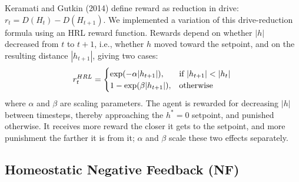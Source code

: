 \documentclass[12pt,fleqn]{article}
\begin{document}
Keramati and Gutkin (2014) define reward as reduction in drive: \(r_t = D(H_t) - D(H_{t+1})\). We implemented a variation of this drive-reduction formula using an HRL reward function. Rewards depend on whether \(|h|\) decreased from \(t\) to \(t+1\), i.e., whether \(h\) moved toward the setpoint, and on the resulting distance \(|h_{t+1}|\), giving two cases:
\begin{equation}\label{eq:reward-hrl}
  r^{HRL}_t =
  \begin{cases}
    \exp(-\alpha|h_{t+1}|),   & \text{if } |h_{t+1}| < |h_t| \\
    1 - \exp(\beta|h_{t+1}|), & \text{otherwise}                 \\
  \end{cases} \\
\end{equation}
where \(\alpha\) and \(\beta\) are scaling parameters. The agent is rewarded for decreasing \(|h|\) between timesteps, thereby approaching the \(h^*=0\) setpoint, and punished otherwise. It receives more reward the closer it gets to the setpoint, and more punishment the farther it is from it; \(\alpha\) and \(\beta\) scale these two effects separately.

\subsection{Homeostatic Negative Feedback (NF)}\label{sec:nf}
\end{document}
